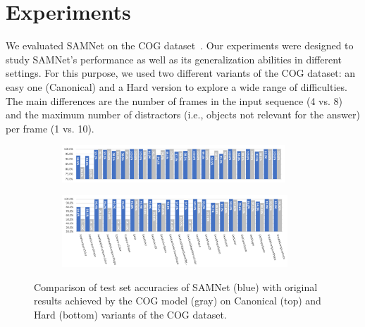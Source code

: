 \section{Experiments}

We evaluated SAMNet on the COG dataset~\cite{yang2018dataset}.
Our experiments were designed to study SAMNet's performance as well as its generalization abilities in different settings.
For this purpose, we used two different variants of the COG dataset: an easy one (Canonical) and a Hard version to explore a wide range of difficulties.
The main differences are the number of frames in the input sequence (4 vs. 8) and the maximum number of distractors (i.e., objects not relevant for the answer) per frame (1 vs. 10).


%
%


\begin{figure}[htbp]
	\centering
  \begin{subfigure}{\textwidth}
    \includegraphics[width=0.92\textwidth]{results/samnet_cog_orig_canonical_no_labels.png}
  \end{subfigure}%
  \newline
  \begin{subfigure}{\textwidth}
	\includegraphics[width=0.93\textwidth]{results/samnet_cog_orig_hard.png}
  \end{subfigure}%
\caption{Comparison of test set accuracies of SAMNet (blue) with original results achieved by the COG model (gray) on Canonical (top) and Hard (bottom) variants of the COG dataset.}
\label{fig:samnet_cog_detailed}
\end{figure}

